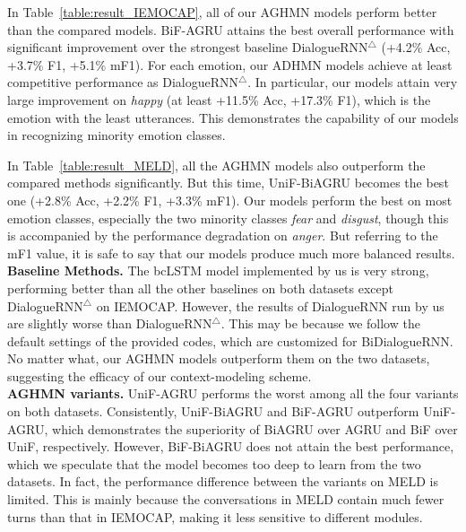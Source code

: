\documentclass[letterpaper]{article} %
\begin{document}
In Table~\ref{table:result_IEMOCAP}, all of our AGHMN models perform better than the compared models. BiF-AGRU attains the best overall performance with significant improvement over the strongest baseline DialogueRNN$^\triangle$ (+4.2\% Acc, +3.7\% F1, +5.1\% mF1). For each emotion, our ADHMN models achieve at least competitive performance as DialogueRNN$^\triangle$. In particular, our models attain very large improvement on \textit{happy} (at least +11.5\% Acc, +17.3\% F1), which is the emotion with the least utterances. This demonstrates the capability of our models in recognizing minority emotion classes.

In Table~\ref{table:result_MELD}, all the AGHMN models also outperform the compared methods significantly. But this time, UniF-BiAGRU becomes the best one (+2.8\% Acc, +2.2\% F1, +3.3\% mF1).
Our models perform the best on most emotion classes, especially the two minority classes \textit{fear} and \textit{disgust}, though this is accompanied by the performance degradation on \textit{anger}. But referring to the mF1 value, it is safe to say that our models produce much more balanced results.
\\[1ex]
\noindent\textbf{Baseline Methods.}
The bcLSTM model implemented by us is very strong, performing better than all the other baselines on both datasets except DialogueRNN$^\triangle$ on IEMOCAP. However, the results of DialogueRNN run by us are slightly worse than DialogueRNN$^\triangle$. This may be because we follow the default settings of the provided codes, which are customized for BiDialogueRNN. No matter what, our AGHMN models outperform them on the two datasets, suggesting the efficacy of our context-modeling scheme.
\\[1ex]
\noindent\textbf{AGHMN variants.}
UniF-AGRU performs the worst among all the four variants on both datasets. Consistently, UniF-BiAGRU and BiF-AGRU outperform UniF-AGRU, which demonstrates the superiority of BiAGRU over AGRU and BiF over UniF, respectively.
However, BiF-BiAGRU does not attain the best performance, which we speculate that the model becomes too deep to learn from the two datasets. In fact, the performance difference between the variants on MELD is limited. This is mainly because the conversations in MELD contain much fewer turns than that in IEMOCAP, making it less sensitive to different modules.
\end{document}
